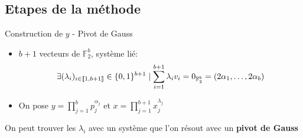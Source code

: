 \documentclass{beamer}
\begin{document}
\subsection{Etapes de la méthode}



\begin{frame}{Construction de $y$ - Pivot de Gauss}
    \begin{itemize}[<+->]
        \item $b+1$ vecteurs de $\mathbb F_2^b$, système lié:
        $$
        \exists (\lambda_i)_{i \in \llbracket 1,b+1 \rrbracket}\in \mathbb \{0,1\}^{b+1} \mid \sum_{i=1}^{b+1} \lambda_iv_i = 0_{\mathbb F_2^b} = (2\alpha_1, \dots, 2\alpha_b)
        $$
        \item On pose $y = \prod_{j=1}^b p_j^{\alpha_j}$ et $x = \prod_{j=1}^{b+1}x_j^{\lambda_j}$ 
    \end{itemize}
\end{frame}

\begin{frame}
    On peut trouver les $\lambda_i$ avec un système que l'on résout avec un \textbf{pivot de Gauss}
\end{frame}


\end{document}
